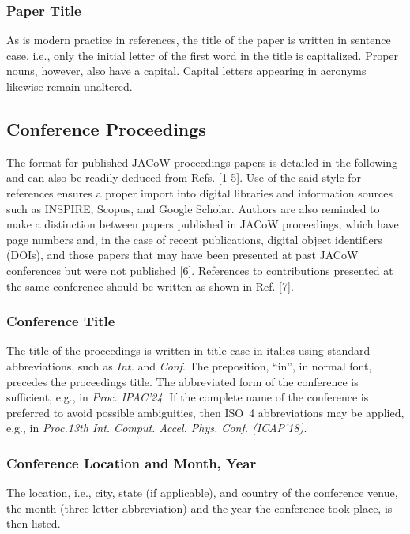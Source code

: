 \documentclass[%
               hyphens,       %
               ]{jacow}
\begin{document}
\subsubsection{Paper Title}

As is modern practice in references, the title of the paper is written in sentence case, i.e., only the initial letter of the first word in the title is capitalized. Proper nouns, however, also have a capital. Capital letters appearing in acronyms likewise remain unaltered.

\subsection{Conference Proceedings}

The format for published JACoW proceedings papers is detailed in the following and can also be readily deduced from Refs. [1-5]. Use of the said style for references ensures a proper import into digital libraries and information sources such as INSPIRE, Scopus, and Google Scholar. Authors are also reminded to make a distinction between papers published in JACoW proceedings, which have page numbers and, in the case of recent publications, digital object identifiers (DOIs), and those papers that may have been presented at past JACoW conferences but were not published [6]. References to contributions presented at the same conference should be written as shown in Ref. [7].

\subsubsection{Conference Title}

The title of the proceedings is written in title case in italics using standard abbreviations, 
such as \textit{Int.} and \textit{Conf}. The preposition, “in”, in normal font, precedes the proceedings title. The abbreviated form of the conference is sufficient, e.g., in \textit{Proc. IPAC’24}. If the complete name of the conference is preferred to avoid possible ambiguities, then ISO~4 abbreviations may be applied, e.g., in \textit{Proc.13th Int. Comput. Accel. Phys. Conf. (ICAP’18)}.

\subsubsection{Conference Location and Month, Year}

The location, i.e., city, state (if applicable), and country of the conference venue, the month (three-letter abbreviation) and the year the conference took place, is then listed.
\end{document}
